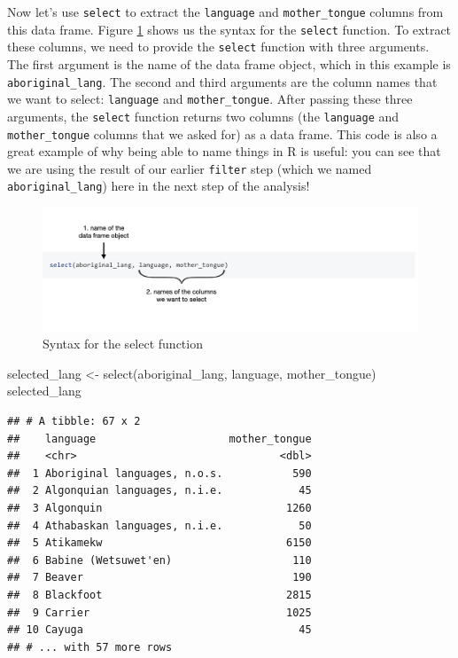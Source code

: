 \documentclass[
]{book}
\newenvironment{Shaded}{\begin{snugshade}}{\end{snugshade}}
\newcommand{\FunctionTok}[1]{\textcolor[rgb]{0,0,0}{#1}}
\newcommand{\NormalTok}[1]{#1}
\newcommand{\OtherTok}[1]{\textcolor[rgb]{0.37,0.37,0.37}{#1}}
\begin{document}
Now let's use \texttt{select}  to extract the \texttt{language} and \texttt{mother\_tongue} columns
from this data frame. Figure \ref{fig:img-select} shows us the syntax for the \texttt{select} function. To extract these columns, we need to provide the \texttt{select}
function with three arguments. The first argument is the name of the data frame
object, which in this example is \texttt{aboriginal\_lang}. The second and third
arguments are the column names that we want to select: \texttt{language} and
\texttt{mother\_tongue}. After passing these three arguments, the \texttt{select} function
returns two columns (the \texttt{language} and \texttt{mother\_tongue} columns that we asked
for) as a data frame. This code is also a great example of why being
able to name things in R is useful: you can see that we are using the
result of our earlier \texttt{filter} step (which we named \texttt{aboriginal\_lang}) here
in the next step of the analysis!

\begin{figure}
\includegraphics[width=1100pt]{img/select_function} \caption{Syntax for the select function}\label{fig:img-select}
\end{figure}

\begin{Shaded}
\begin{Highlighting}[]
\NormalTok{selected\_lang }\OtherTok{\textless{}{-}} \FunctionTok{select}\NormalTok{(aboriginal\_lang, language, mother\_tongue)}
\NormalTok{selected\_lang}
\end{Highlighting}
\end{Shaded}

\begin{verbatim}
## # A tibble: 67 x 2
##    language                     mother_tongue
##    <chr>                                <dbl>
##  1 Aboriginal languages, n.o.s.           590
##  2 Algonquian languages, n.i.e.            45
##  3 Algonquin                             1260
##  4 Athabaskan languages, n.i.e.            50
##  5 Atikamekw                             6150
##  6 Babine (Wetsuwet'en)                   110
##  7 Beaver                                 190
##  8 Blackfoot                             2815
##  9 Carrier                               1025
## 10 Cayuga                                  45
## # ... with 57 more rows
\end{verbatim}
\end{document}
